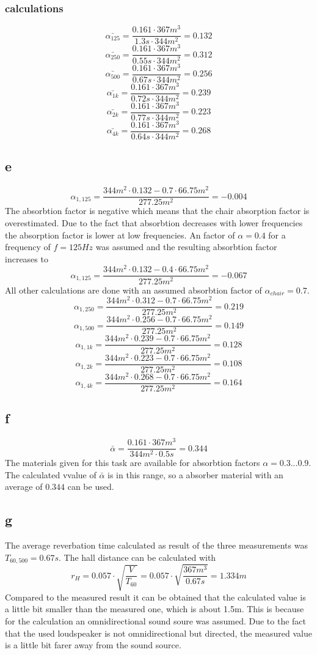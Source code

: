 \documentclass{article}
\begin{document}
\subsubsection{calculations}
$$\bar{\alpha_{125}}=\frac{0.161\cdot 367m^3}{1.3s\cdot 344m^2}=0.132$$
$$\bar{\alpha_{250}}=\frac{0.161\cdot 367m^3}{0.55s\cdot 344m^2}=0.312$$
$$\bar{\alpha_{500}}=\frac{0.161\cdot 367m^3}{0.67s\cdot 344m^2}=0.256$$
$$\bar{\alpha_{1k}}=\frac{0.161\cdot 367m^3}{0.72s\cdot 344m^2}=0.239$$
$$\bar{\alpha_{2k}}=\frac{0.161\cdot 367m^3}{0.77s\cdot 344m^2}=0.223$$
$$\bar{\alpha_{4k}}=\frac{0.161\cdot 367m^3}{0.64s\cdot 344m^2}=0.268$$
\subsection{e}
$$\alpha_{1,125}=\frac{344m^2\cdot 0.132-0.7\cdot 66.75m^2}{277.25m^2}=-0.004$$
The absorbtion factor is negative which means that the chair absorption factor is overestimated. Due to the fact that absorbtion decreases with lower frequencies the absorption factor is lower at low frequencies.  An factor of $\alpha=0.4$ for a frequency of $f=125Hz$ was assumed and the resulting absorbtion factor increases to
 $$\alpha_{1,125}=\frac{344m^2\cdot 0.132-0.4\cdot 66.75m^2}{277.25m^2}=-0.067$$
All other calculations are done with an assumed absorbtion factor of $\alpha_{chair}=0.7$.
 $$\alpha_{1,250}=\frac{344m^2\cdot 0.312-0.7\cdot 66.75m^2}{277.25m^2}=0.219$$
 $$\alpha_{1,500}=\frac{344m^2\cdot 0.256-0.7\cdot 66.75m^2}{277.25m^2}=0.149$$
 $$\alpha_{1,1k}=\frac{344m^2\cdot 0.239-0.7\cdot 66.75m^2}{277.25m^2}=0.128$$
 $$\alpha_{1,2k}=\frac{344m^2\cdot 0.223-0.7\cdot 66.75m^2}{277.25m^2}=0.108$$
 $$\alpha_{1,4k}=\frac{344m^2\cdot 0.268-0.7\cdot 66.75m^2}{277.25m^2}=0.164$$
\subsection{f}
$$\bar{\alpha}=\frac{0.161\cdot 367m^3}{344m^2\cdot 0.5s}=0.344$$
The materials given for this task are available for absorbtion factors $\alpha=0.3 ... 0.9$. The calculated vvalue of $\bar{\alpha}$ is in this range, so a absorber material with an average of $0.344$ can be used.
\subsection{g}
The average reverbation time calculated as result of the three measurements was $T_{60,500}=0.67s$. The hall distance can be calculated with 
$$r_H=0.057\cdot\sqrt{\frac{V}{T_{60}}}=0.057\cdot\sqrt{\frac{367m^3}{0.67s}}=1.334m$$
Compared to the measured result it can be obtained that the calculated value is a little bit smaller than the measured one, which is about 1.5m. This is because for the calculation an omnidirectional sound soure was assumed. Due to the fact that the used loudspeaker is not omnidirectional but directed, the measured value is a little bit farer away from the sound source. 
\end{document}

